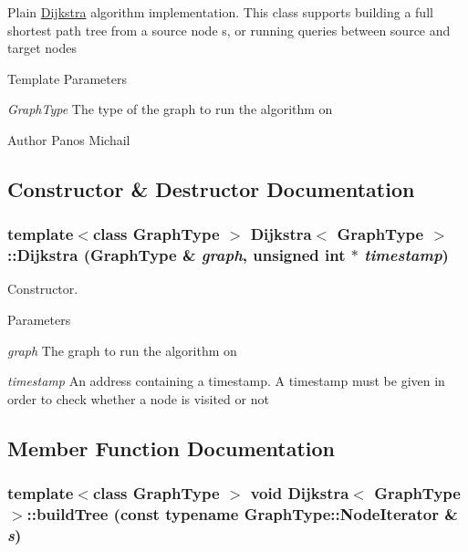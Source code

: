 Plain \hyperlink{class_dijkstra}{Dijkstra} algorithm implementation. This class supports building a full shortest path tree from a source node s, or running queries between source and target nodes


\begin{DoxyTemplParams}{Template Parameters}
\item[{\em GraphType}]The type of the graph to run the algorithm on \end{DoxyTemplParams}
\begin{DoxyAuthor}{Author}
Panos Michail 
\end{DoxyAuthor}


\subsection{Constructor \& Destructor Documentation}
\hypertarget{class_dijkstra_a51febd724adf95d1a00e34107febc6d1}{
\subsubsection[{Dijkstra}]{\setlength{\rightskip}{0pt plus 5cm}template$<$class GraphType $>$ {\bf Dijkstra}$<$ GraphType $>$::{\bf Dijkstra} (GraphType \& {\em graph}, \/  unsigned int $\ast$ {\em timestamp})}}
\label{class_dijkstra_a51febd724adf95d1a00e34107febc6d1}


Constructor. 


\begin{DoxyParams}{Parameters}
\item[{\em graph}]The graph to run the algorithm on \item[{\em timestamp}]An address containing a timestamp. A timestamp must be given in order to check whether a node is visited or not \end{DoxyParams}


\subsection{Member Function Documentation}
\hypertarget{class_dijkstra_a8d71229d80ea19a2ad9b40129060954d}{
\subsubsection[{buildTree}]{\setlength{\rightskip}{0pt plus 5cm}template$<$class GraphType $>$ void {\bf Dijkstra}$<$ GraphType $>$::buildTree (const typename GraphType::NodeIterator \& {\em s})}}
\label{class_dijkstra_a8d71229d80ea19a2ad9b40129060954d}



